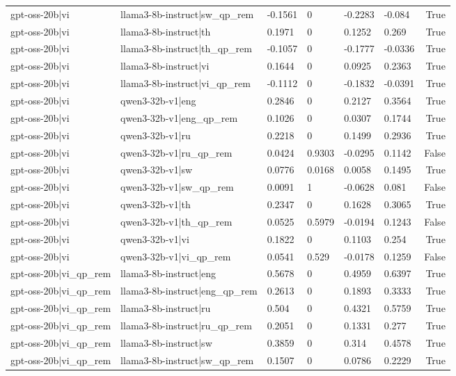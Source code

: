 \begin{table}
\begin{tabular}{llllllr}
gpt-oss-20b|vi & llama3-8b-instruct|sw_qp_rem & -0.1561 & 0 & -0.2283 & -0.084 & True \\
gpt-oss-20b|vi & llama3-8b-instruct|th & 0.1971 & 0 & 0.1252 & 0.269 & True \\
gpt-oss-20b|vi & llama3-8b-instruct|th_qp_rem & -0.1057 & 0 & -0.1777 & -0.0336 & True \\
gpt-oss-20b|vi & llama3-8b-instruct|vi & 0.1644 & 0 & 0.0925 & 0.2363 & True \\
gpt-oss-20b|vi & llama3-8b-instruct|vi_qp_rem & -0.1112 & 0 & -0.1832 & -0.0391 & True \\
gpt-oss-20b|vi & qwen3-32b-v1|eng & 0.2846 & 0 & 0.2127 & 0.3564 & True \\
gpt-oss-20b|vi & qwen3-32b-v1|eng_qp_rem & 0.1026 & 0 & 0.0307 & 0.1744 & True \\
gpt-oss-20b|vi & qwen3-32b-v1|ru & 0.2218 & 0 & 0.1499 & 0.2936 & True \\
gpt-oss-20b|vi & qwen3-32b-v1|ru_qp_rem & 0.0424 & 0.9303 & -0.0295 & 0.1142 & False \\
gpt-oss-20b|vi & qwen3-32b-v1|sw & 0.0776 & 0.0168 & 0.0058 & 0.1495 & True \\
gpt-oss-20b|vi & qwen3-32b-v1|sw_qp_rem & 0.0091 & 1 & -0.0628 & 0.081 & False \\
gpt-oss-20b|vi & qwen3-32b-v1|th & 0.2347 & 0 & 0.1628 & 0.3065 & True \\
gpt-oss-20b|vi & qwen3-32b-v1|th_qp_rem & 0.0525 & 0.5979 & -0.0194 & 0.1243 & False \\
gpt-oss-20b|vi & qwen3-32b-v1|vi & 0.1822 & 0 & 0.1103 & 0.254 & True \\
gpt-oss-20b|vi & qwen3-32b-v1|vi_qp_rem & 0.0541 & 0.529 & -0.0178 & 0.1259 & False \\
gpt-oss-20b|vi_qp_rem & llama3-8b-instruct|eng & 0.5678 & 0 & 0.4959 & 0.6397 & True \\
gpt-oss-20b|vi_qp_rem & llama3-8b-instruct|eng_qp_rem & 0.2613 & 0 & 0.1893 & 0.3333 & True \\
gpt-oss-20b|vi_qp_rem & llama3-8b-instruct|ru & 0.504 & 0 & 0.4321 & 0.5759 & True \\
gpt-oss-20b|vi_qp_rem & llama3-8b-instruct|ru_qp_rem & 0.2051 & 0 & 0.1331 & 0.277 & True \\
gpt-oss-20b|vi_qp_rem & llama3-8b-instruct|sw & 0.3859 & 0 & 0.314 & 0.4578 & True \\
gpt-oss-20b|vi_qp_rem & llama3-8b-instruct|sw_qp_rem & 0.1507 & 0 & 0.0786 & 0.2229 & True \\

\end{tabular}
\end{table}
